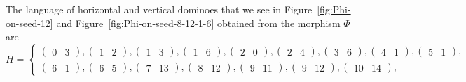 \documentclass[12pt]{amsart}
\begin{document}
\begin{exo}[label={exo:HV-dominoes}]
    The language of horizontal and vertical dominoes that we see in 
    Figure~\ref{fig:Phi-on-seed-12} 
    and
    Figure~\ref{fig:Phi-on-seed-8-12-1-6}
    obtained from the morphism $\Phi$ are
    \[
        H = \left\{
            \begin{array}{l}
\left(\begin{smallmatrix}0  & 3 \end{smallmatrix}\right),
\left(\begin{smallmatrix}1  & 2 \end{smallmatrix}\right),
\left(\begin{smallmatrix}1  & 3 \end{smallmatrix}\right),
\left(\begin{smallmatrix}1  & 6 \end{smallmatrix}\right),
\left(\begin{smallmatrix}2  & 0 \end{smallmatrix}\right),
\left(\begin{smallmatrix}2  & 4 \end{smallmatrix}\right),
\left(\begin{smallmatrix}3  & 6 \end{smallmatrix}\right),
\left(\begin{smallmatrix}4  & 1 \end{smallmatrix}\right),
\left(\begin{smallmatrix}5  & 1 \end{smallmatrix}\right),\\
\left(\begin{smallmatrix}6  & 1 \end{smallmatrix}\right),
\left(\begin{smallmatrix}6  & 5 \end{smallmatrix}\right),
\left(\begin{smallmatrix}7  & 13\end{smallmatrix}\right),
\left(\begin{smallmatrix}8  & 12\end{smallmatrix}\right),
\left(\begin{smallmatrix}9  & 11\end{smallmatrix}\right),
\left(\begin{smallmatrix}9  & 12\end{smallmatrix}\right),
\left(\begin{smallmatrix}10 & 14\end{smallmatrix}\right),

\end{array}\]
\end{exo}
\end{document}
